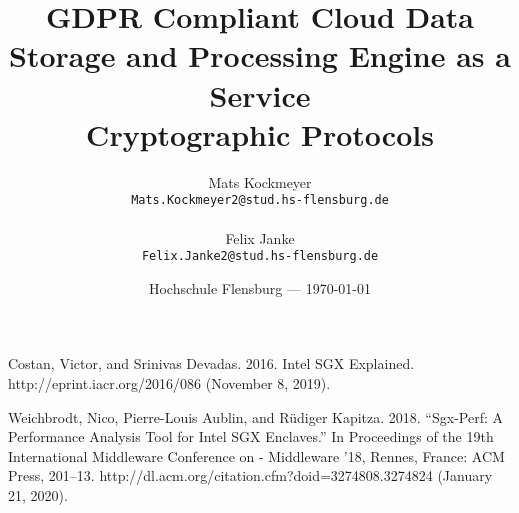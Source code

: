 \documentclass{article}
\title{GDPR Compliant Cloud Data Storage and Processing Engine as a Service\\[0.4em]\smaller{}\smaller{}Cryptographic Protocols}
\author{
	Mats Kockmeyer\\ \texttt{Mats.Kockmeyer2@stud.hs-flensburg.de}\\\\
	Felix Janke\\ \texttt{Felix.Janke2@stud.hs-flensburg.de}
}
\date{Hochschule Flensburg --- \today} %
\begin{document}
\begin{acronym}
\end{acronym}

\maketitle %

\newcommand{\acr}[1]{\acs{#1} (\aclu{#1})}

 \newcommand{\wip}[1]{
  \ifthenelse{\isempty{#1}}%
    {\colorbox{yellow!50}{$\boxast $}}%
    {\colorbox{yellow!50}{$\boxast $}\textit{\smaller{} #1} }%
   }






\begin{thebibliography}{9}
Costan, Victor, and Srinivas Devadas. 2016. Intel SGX Explained. http://eprint.iacr.org/2016/086 (November 8, 2019).

Weichbrodt, Nico, Pierre-Louis Aublin, and Rüdiger Kapitza. 2018. “Sgx-Perf: A Performance Analysis Tool for Intel SGX Enclaves.” In Proceedings of the 19th International Middleware Conference on - Middleware ’18, Rennes, France: ACM Press, 201–13. http://dl.acm.org/citation.cfm?doid=3274808.3274824 (January 21, 2020).


\end{thebibliography}
\end{document}
